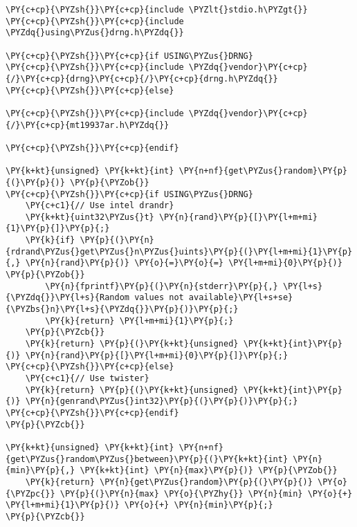 \begin{Verbatim}[commandchars=\\\{\}]
\PY{c+cp}{\PYZsh{}}\PY{c+cp}{include \PYZlt{}stdio.h\PYZgt{}}
\PY{c+cp}{\PYZsh{}}\PY{c+cp}{include \PYZdq{}using\PYZus{}drng.h\PYZdq{}}

\PY{c+cp}{\PYZsh{}}\PY{c+cp}{if USING\PYZus{}DRNG}
\PY{c+cp}{\PYZsh{}}\PY{c+cp}{include \PYZdq{}vendor}\PY{c+cp}{/}\PY{c+cp}{drng}\PY{c+cp}{/}\PY{c+cp}{drng.h\PYZdq{}}
\PY{c+cp}{\PYZsh{}}\PY{c+cp}{else}

\PY{c+cp}{\PYZsh{}}\PY{c+cp}{include \PYZdq{}vendor}\PY{c+cp}{/}\PY{c+cp}{mt19937ar.h\PYZdq{}}

\PY{c+cp}{\PYZsh{}}\PY{c+cp}{endif}

\PY{k+kt}{unsigned} \PY{k+kt}{int} \PY{n+nf}{get\PYZus{}random}\PY{p}{(}\PY{p}{)} \PY{p}{\PYZob{}}
\PY{c+cp}{\PYZsh{}}\PY{c+cp}{if USING\PYZus{}DRNG}
    \PY{c+c1}{// Use intel drandr}
    \PY{k+kt}{uint32\PYZus{}t} \PY{n}{rand}\PY{p}{[}\PY{l+m+mi}{1}\PY{p}{]}\PY{p}{;}
    \PY{k}{if} \PY{p}{(}\PY{n}{rdrand\PYZus{}get\PYZus{}n\PYZus{}uints}\PY{p}{(}\PY{l+m+mi}{1}\PY{p}{,} \PY{n}{rand}\PY{p}{)} \PY{o}{=}\PY{o}{=} \PY{l+m+mi}{0}\PY{p}{)} \PY{p}{\PYZob{}}
        \PY{n}{fprintf}\PY{p}{(}\PY{n}{stderr}\PY{p}{,} \PY{l+s}{\PYZdq{}}\PY{l+s}{Random values not available}\PY{l+s+se}{\PYZbs{}n}\PY{l+s}{\PYZdq{}}\PY{p}{)}\PY{p}{;}
        \PY{k}{return} \PY{l+m+mi}{1}\PY{p}{;}
    \PY{p}{\PYZcb{}}
    \PY{k}{return} \PY{p}{(}\PY{k+kt}{unsigned} \PY{k+kt}{int}\PY{p}{)} \PY{n}{rand}\PY{p}{[}\PY{l+m+mi}{0}\PY{p}{]}\PY{p}{;}
\PY{c+cp}{\PYZsh{}}\PY{c+cp}{else}
    \PY{c+c1}{// Use twister}
    \PY{k}{return} \PY{p}{(}\PY{k+kt}{unsigned} \PY{k+kt}{int}\PY{p}{)} \PY{n}{genrand\PYZus{}int32}\PY{p}{(}\PY{p}{)}\PY{p}{;}
\PY{c+cp}{\PYZsh{}}\PY{c+cp}{endif}
\PY{p}{\PYZcb{}}

\PY{k+kt}{unsigned} \PY{k+kt}{int} \PY{n+nf}{get\PYZus{}random\PYZus{}between}\PY{p}{(}\PY{k+kt}{int} \PY{n}{min}\PY{p}{,} \PY{k+kt}{int} \PY{n}{max}\PY{p}{)} \PY{p}{\PYZob{}}
    \PY{k}{return} \PY{n}{get\PYZus{}random}\PY{p}{(}\PY{p}{)} \PY{o}{\PYZpc{}} \PY{p}{(}\PY{n}{max} \PY{o}{\PYZhy{}} \PY{n}{min} \PY{o}{+} \PY{l+m+mi}{1}\PY{p}{)} \PY{o}{+} \PY{n}{min}\PY{p}{;}
\PY{p}{\PYZcb{}}
\end{Verbatim}
